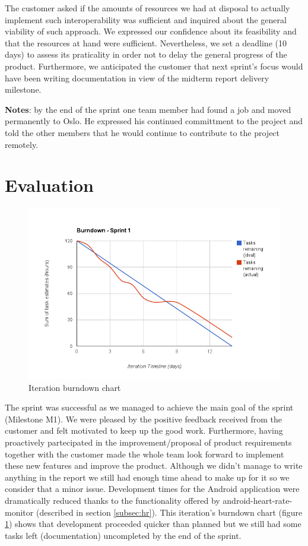 The customer asked if the amounts of resources we had at disposal to actually implement such interoperability was sufficient and inquired about the general viability of such approach.
We expressed our confidence about its feasibility and that the resources at hand were sufficient.
Nevertheless, we set a deadline (10 days) to assess its praticality in order not to delay the general progress of the product.
Furthermore, we anticipated the customer that next sprint's focus would have been writing documentation in view of the midterm report delivery milestone.

\textbf{Notes}: by the end of the sprint one team member had found a job and moved permanently to Oslo.
He expressed his continued committment to the project and told the other members that he would continue to contribute to the project remotely.

\section{Evaluation}

\begin{figure}
\centering
\includegraphics[scale=0.60]{../Figures/burndownSprint1.png}
\caption{Iteration burndown chart}
\label{figure:burndownsprint1}
\end{figure}

The sprint was successful as we managed to achieve the main goal of the sprint (Milestone M1).
We were pleased by the positive feedback received from the customer and felt motivated to keep up the good work. 
Furthermore, having proactively partecipated in the improvement/proposal of product requirements together with the customer made the whole team look forward to implement these new features and improve the product. 
Although we didn't manage to write anything in the report we still had enough time ahead to make up for it so we consider that a minor issue.
Development times for the Android application were dramatically reduced thanks to the functionality offered by android-heart-rate-monitor (described in section \ref{subsec:hr}).
This iteration's burndown chart (figure \ref{figure:burndownsprint1}) shows that development proceeded quicker than planned but we still had some tasks left (documentation) uncompleted by the end of the sprint.

